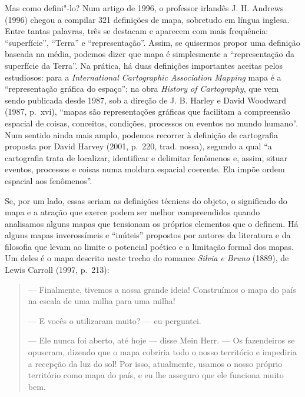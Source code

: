 Mas como defini"-lo? Num artigo de 1996, o professor irlandês J. H.
Andrews (1996) chegou a compilar 321 definições de mapa, sobretudo em
língua inglesa. Entre tantas palavras, três se destacam e aparecem com
mais frequência: ``superfície'', ``Terra'' e ``representação''. Assim,
se quisermos propor uma definição baseada na média, podemos dizer que
mapa é simplesmente a ``representação da superfície da Terra''. Na
prática, há duas definições importantes aceitas pelos estudiosos: para a
\emph{International Cartographic Association Mapping} mapa é a %
``representação gráfica do espaço''; na obra \emph{History of
Cartography}, que vem sendo publicada desde 1987, sob a direção de J. B.
Harley e David Woodward (1987, p.~xvi), ``mapas são representações
gráficas que facilitam a compreensão espacial de coisas, conceitos,
condições, processos ou eventos no mundo humano''. Num sentido ainda
mais amplo, podemos recorrer à definição de cartografia proposta por
David Harvey (2001, p.~220, trad. nossa), segundo a qual ``a cartografia
trata de localizar, identificar e delimitar fenômenos e, assim, situar
eventos, processos e coisas numa moldura espacial coerente. Ela impõe
ordem espacial aos fenômenos''.

Se, por um lado, essas seriam as definições técnicas do objeto, o
significado do mapa e a atração que exerce podem ser melhor
compreendidos quando analisamos alguns mapas que tensionam os próprios
elementos que o definem. Há alguns mapas inverossímeis e ``inúteis''
propostos por autores da literatura e da filosofia que levam ao limite o
potencial poético e a limitação formal dos mapas. Um deles é o mapa
descrito neste trecho do romance \emph{Silvia e Bruno} (1889), de Lewis
Carroll (1997, p.~213):

\begin{quote}
--- Finalmente, tivemos a nossa grande ideia! Construímos o mapa do país
na escala de uma milha para uma milha!

--- E vocês o utilizaram muito? --- eu perguntei.

--- Ele nunca foi aberto, até hoje --- disse Mein Herr. --- Os fazendeiros
se opuseram, dizendo que o mapa cobriria todo o nosso território e
impediria a recepção da luz do sol! Por isso, atualmente, usamos o nosso
próprio território como mapa do país, e eu lhe asseguro que ele funciona
muito bem.
\end{quote}

